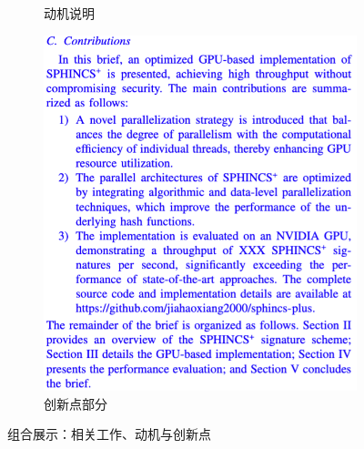 \documentclass[report]{../../custom}
\begin{document}
\begin{figure}[ht]
\begin{subfigure}[b]{0.32\textwidth}
\caption{动机说明}
\label{fig:motivation}
\end{subfigure} \hfill
\begin{subfigure}[b]{0.32\textwidth}
\centering
\includegraphics[width=\textwidth]{./fig/contributions.png}
\caption{创新点部分}
\label{fig:contributions}
\end{subfigure}

\caption{组合展示：相关工作、动机与创新点}
\label{fig:composite}
\end{figure}



\end{document}
